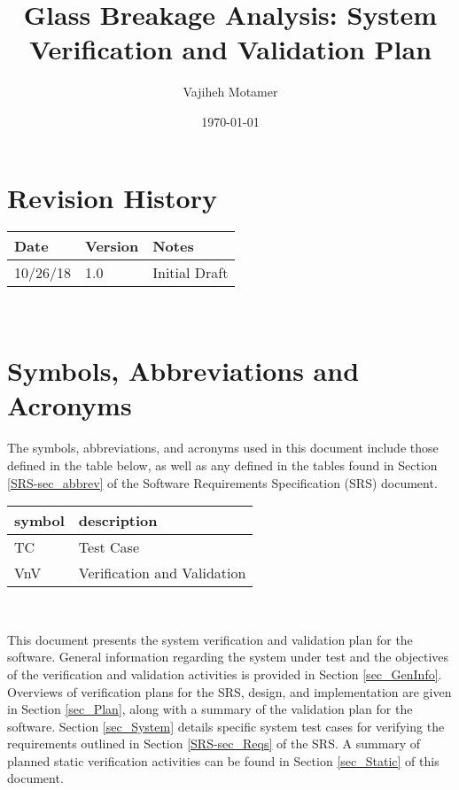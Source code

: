 \documentclass[12pt, titlepage]{article}
\begin{document}
\title{Glass Breakage Analysis: System Verification and Validation Plan} 
\author{Vajiheh Motamer}
\date{\today}
	
\maketitle


\section{Revision History}

\begin{tabularx}{\textwidth}{p{3cm}p{2cm}X}
\toprule {\bf Date} & {\bf Version} & {\bf Notes}\\
\midrule
10/26/18 & 1.0 & Initial Draft\\

\bottomrule
\end{tabularx}

~\newpage

\section{Symbols, Abbreviations and Acronyms}
The symbols, abbreviations, and acronyms used in this document include those 
defined in the table below, as well as any defined in the tables found in 
Section \ref{SRS-sec_abbrev} of the Software Requirements Specification (SRS) 
document.
\newline

\renewcommand{\arraystretch}{1.2}
\begin{tabular}{l l} 
  \toprule		
  \textbf{symbol} & \textbf{description}\\
  \midrule 
    TC & Test Case\\
  VnV & Verification and Validation\\
  \bottomrule
\end{tabular}\\

\newpage

\tableofcontents

\listoftables

\newpage


\noindent This document presents the system verification and validation plan 
for the software. General information regarding the system under test and the 
objectives of the verification and validation activities is provided in Section 
\ref{sec_GenInfo}. Overviews of verification plans for the SRS, design, and 
implementation are given in Section \ref{sec_Plan}, along with a summary of the 
validation plan for the software. Section \ref{sec_System} details specific  
system test cases for verifying the requirements outlined in Section 
\ref{SRS-sec_Reqs} of the SRS. A summary of planned static verification 
activities can be found in Section \ref{sec_Static} of this document.
\end{document}
